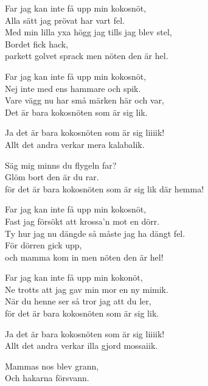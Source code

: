 \vspace{10pt}
Far jag kan inte få upp min kokosnöt,\\
Alla sätt jag prövat har vart fel.\\
Med min lilla yxa högg jag tills jag blev stel,\\
Bordet fick hack,\\
parkett golvet sprack men nöten den är hel.\par
\vspace{10pt}
Far jag kan inte få upp min kokosnöt,\\
Nej inte med ens hammare och spik.\\
Vare vägg nu har små märken här och var,\\
Det är bara kokosnöten som är sig lik.\par
\vspace{10pt}
Ja det är bara kokosnöten som är sig liiiik!\\
Allt det andra verkar mera kalabalik.\par
\vspace{10pt}
Säg mig minns du flygeln far?\\
Glöm bort den är du rar.\\
för det är bara kokosnöten som är sig lik där hemma!\par
\vspace{10pt}
Far jag kan inte få upp min kokosnöt,\\
Fast jag försökt att krossa'n mot en dörr.\\
Ty hur jag nu dängde så måste jag ha dängt fel.\\
För dörren gick upp,\\
och mamma kom in men nöten den är hel!\par
\vspace{10pt}
Far jag kan inte få upp min kokonöt,\\
Ne trotts att jag gav min mor en ny mimik.\\
När du henne ser så tror jag att du ler,\\
för det är bara kokosnöten som är sig lik.\par
\vspace{10pt}
Ja det är bara kokosnöten som är sig liiiik!\\
Allt det andra verkar illa gjord mossaiik.\par
\vspace{10pt}
Mammas nos blev grann,\\
Och hakarna försvann.\\
